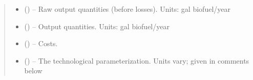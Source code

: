 \documentclass[letterpaper,10pt,english]{sphinxmanual}
\begin{document}
\begin{fulllineitems}
\begin{quote}
\begin{description}
\begin{itemize}
\item {} 
\sphinxAtStartPar
{} () – Raw output quantities (before losses). Units: gal biofuel/year

\item {} 
\sphinxAtStartPar
{} () – Output quantities. Units: gal biofuel/year

\item {} 
\sphinxAtStartPar
{} () – Costs.

\item {} 
\sphinxAtStartPar
{} () – The technological parameterization. Units vary; given in comments below

\end{itemize}

\end{description}\end{quote}

\end{fulllineitems}

\end{document}
